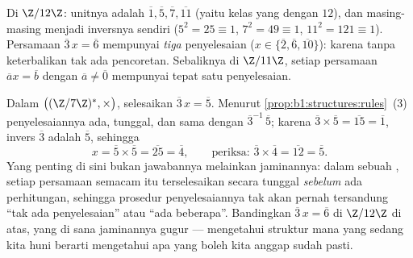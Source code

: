 \begin{example}[Berhitung di $\Z/n\Z$]\label{ex:b1:structures:zncomputation}
Di $\Z/12\Z$: unitnya adalah $\overline 1, \overline 5, \overline 7,
\overline{11}$ (yaitu kelas yang  dengan $12$), dan masing-masing menjadi
inversnya sendiri ($5^2 = 25 \equiv 1$, $7^2 = 49 \equiv 1$, $11^2 = 121 \equiv
1$). Persamaan $\overline 3\, x = \overline 6$ mempunyai \emph{tiga}
penyelesaian ($x \in \{\overline 2, \overline 6, \overline{10}\}$):
karena tanpa keterbalikan tak ada pencoretan. Sebaliknya di $\Z/11\Z$,
setiap persamaan $\overline a x = \overline b$ dengan $\overline a \neq
\overline 0$ mempunyai tepat satu penyelesaian.
\end{example}

\begin{example}\label{ex:b1:structures:solving}
Dalam  $\bigl((\Z/7\Z)^*, \times\bigr)$, selesaikan $\overline
3\,x = \overline 5$. Menurut \cref{prop:b1:structures:rules}~(3)
penyelesaiannya ada, tunggal, dan sama dengan $\overline3^{-1}\,
\overline5$; karena $\overline3 \times \overline5 = \overline{15}
= \overline1$, invers $\overline 3$ adalah $\overline 5$, sehingga
\[
x = \overline5 \times \overline5 = \overline{25} = \overline4,
\qquad\text{periksa: } \overline3 \times \overline4 =
\overline{12} = \overline5 .
\]
Yang penting di sini bukan jawabannya melainkan jaminannya: dalam sebuah ,
setiap persamaan semacam itu terselesaikan secara tunggal \emph{sebelum} ada
perhitungan, sehingga prosedur penyelesaiannya tak akan pernah tersandung ``tak ada
penyelesaian'' atau ``ada beberapa''. Bandingkan $\overline3\,x = \overline6$
di $\Z/12\Z$ di atas, yang di sana jaminannya gugur --- mengetahui struktur
mana yang sedang kita huni berarti mengetahui apa yang boleh kita anggap sudah pasti.
\end{example}

